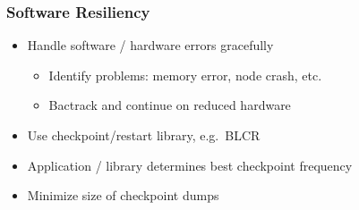     \begin{frame}[fragile] \frametitle{Software Resiliency}
      \begin{itemize}
        \item Handle software / hardware errors gracefully
        \begin{itemize}
          \item Identify problems: memory error, node crash, etc.
          \item Bactrack and continue on reduced hardware
        \end{itemize}
        \item Use checkpoint/restart library, e.g.~BLCR
        \item Application / library determines best checkpoint frequency
        \item Minimize size of checkpoint dumps
      \end{itemize}
\end{frame}
